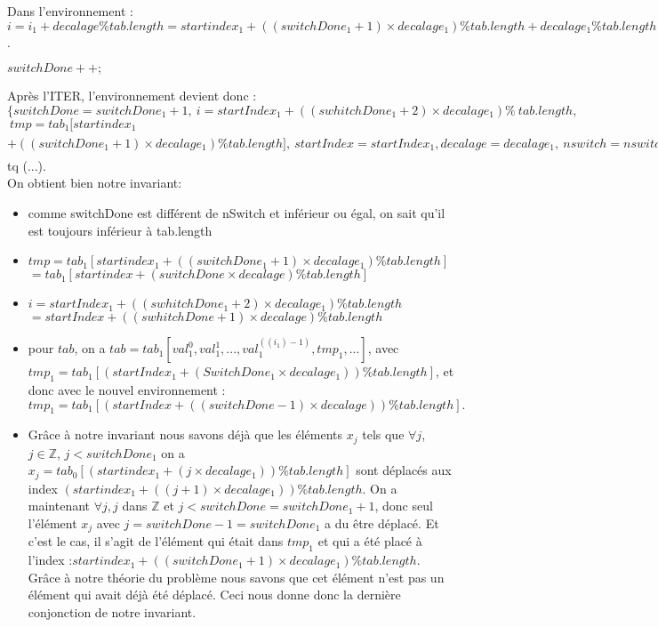  Dans l'environnement : $i = i_{1} + decalage \% tab.length = startindex_{1} + ((switchDone_{1}+1)\times decalage_{1}) \% tab.length  + decalage_{1} \%tab.length = startIndex_{1} + ((swhitchDone_{1}+2)\times decalage_{1}) \%tab.length$.\\
 
\begin{center}
 $switchDone++;$\\
\end{center}
 
Après l'ITER, l'environnement devient donc : \\

\noindent$\{switchDone = switchDone_{1}+1,\ i = startIndex_{1} + ((swhitchDone_{1}+2)\times decalage_1) \%\ tab.length,$\\
$\ tmp = tab_{1}[startindex_{1}$ $+ ((switchDone_{1}+1)\times decalage_{1}) \% tab.length],\ startIndex = startIndex_{1}, decalage = decalage_{1},\ nswitch = nswitch_{1},\ tab = tab_{1}[val_{1}^{0},val_{1}^{1}, ..., val_{1}^{(i_{1}-1)}, tmp_{1}, ...,val_{1}^{tab.length-1}]\}$\\
tq (...).\\

On obtient bien notre invariant:
\begin{itemize}
	\item comme switchDone est différent de nSwitch et inférieur ou égal, on sait qu'il est toujours inférieur à tab.length
	\item $tmp = tab_{1}[startindex_{1} + ((switchDone_{1}+1)\times decalage_{1}) \% tab.length]$ 
		\subitem $= tab_{1}[startindex + (switchDone\times decalage) \% tab.length]$
	\item $i = startIndex_{1} + ((swhitchDone_{1}+2)\times decalage_{1}) \% tab.length $
		\subitem $= startIndex + ((swhitchDone+1)\times decalage) \%tab.length$
	\item pour $tab$, on a $tab = tab_{1}[val_{1}^{0},val_{1}^{1}, ..., val_{1}^{((i_{1})-1)}, tmp_{1}, ...]$, avec $tmp_{1} = tab_{1}[(startIndex_{1} + (SwitchDone_{1}\times decalage_{1})) \% tab.length]$, et donc avec le nouvel environnement : $tmp_{1} = tab_{1}[(startIndex + ((switchDone-1)\times decalage)) \% tab.length].$ 
	\item Grâce à notre invariant nous savons déjà que les éléments $x_{j}$ tels que $\forall j$, $j \in \mathbb{Z}$, $j<switchDone_{1}$ on a $x_{j}=tab_{0}[(startindex_{1} + (j\times decalage_{1})) \% tab.length]$ sont déplacés aux index $(startindex_{1} + ((j+1)\times decalage_{1}))\% tab.length$. On a maintenant $\forall j, j$ dans $\mathbb{Z}$ et $j<switchDone=switchDone_{1} + 1$, donc seul l'élément $x_{j}$ avec $j= switchDone - 1 = switchDone_{1}$ a du être déplacé. Et c'est le cas, il s'agit de l'élément qui était dans $tmp_{1}$ et qui a été placé à l'index :$ startindex_{1} + ((switchDone_{1}+1)\times decalage_{1}) \% tab.length$. Grâce à notre théorie du problème nous savons que cet élément n'est pas un élément qui avait déjà été déplacé. Ceci nous donne donc la dernière conjonction de notre invariant. \\
\end{itemize}

